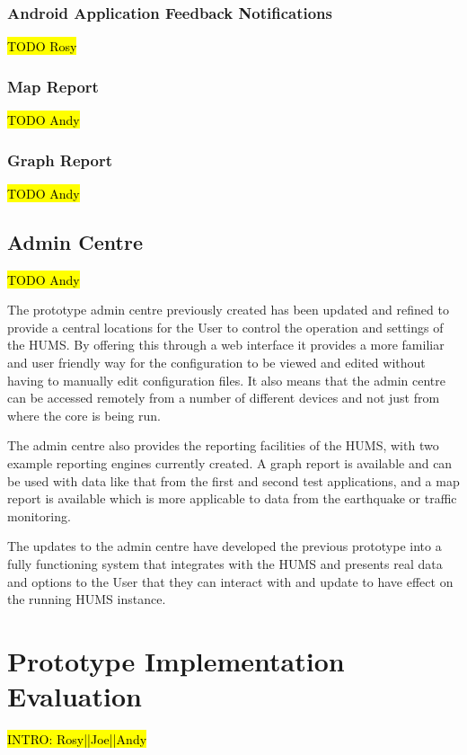 \documentclass[10pt,a4paper]{article}
\begin{document}
\subsubsection{Android Application Feedback Notifications}
\hl{TODO Rosy}

\subsubsection{Map Report}
\hl{TODO Andy}
\subsubsection{Graph Report}
\hl{TODO Andy}

\subsection{Admin Centre}
\label{sec:admin}
\hl{TODO Andy}

The prototype admin centre previously created has been updated and refined to provide a central locations for the User to control the operation and settings of the HUMS. By offering this through a web interface it provides a more familiar and user friendly way for the configuration to be viewed and edited without having to manually edit configuration files. It also means that the admin centre can be accessed remotely from a number of different devices and not just from where the core is being run.

The admin centre also provides the reporting facilities of the HUMS, with two example reporting engines currently created. A graph report is available and can be used with data like that from the first and second test applications, and a map report is available which is more applicable to data from the earthquake or traffic monitoring.

The updates to the admin centre have developed the previous prototype into a fully functioning system that integrates with the HUMS and presents real data and options to the User that they can interact with and update to have effect on the running HUMS instance.

\section{Prototype Implementation Evaluation}
\label{sec:prototype}
\hl{INTRO: Rosy||Joe||Andy}
\end{document}
